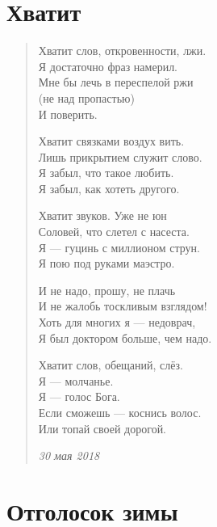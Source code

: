 \documentclass[a4paper,12pt,fleqn]{book}\usepackage{polyglossia}\setdefaultlanguage[babelshorthands=true]{russian}\setotherlanguage{english}\defaultfontfeatures{Ligatures=TeX,Mapping=tex-text}\usepackage{xcolor}\newcommand{\ml}[3]{#2}
\begin{document}
\section{Хватит}

\begin{verse}
Хватит слов, откровенности, лжи.\\
Я достаточно фраз намерил.\\
Мне бы лечь в переспелой ржи\\
(не над пропастью)\\
И поверить.

Хватит связками воздух вить.\\
Лишь прикрытием служит слово.\\
Я забыл, что такое любить.\\
Я забыл, как хотеть другого.

Хватит звуков. Уже не юн\\
Соловей, что слетел с насеста.\\
Я --- гуцинь с миллионом струн.\\
Я пою под руками маэстро.

И не надо, прошу, не плачь\\
И не жалобь тоскливым взглядом!\\
Хоть для многих я --- недоврач,\\
Я был доктором больше, чем надо.

Хватит слов, обещаний, слёз.\\
Я --- молчанье.\\
Я --- голос Бога.\\
Если сможешь --- коснись волос.\\
Или топай своей дорогой.

\emph{30 мая 2018}
\end{verse} 
\newpage

\section{Отголосок зимы}
\end{document}
